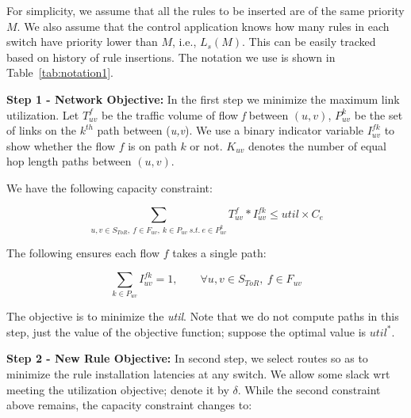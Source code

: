 For simplicity, we assume that all the rules to be inserted are of the same priority $M$.  We also assume that the control application knows how many rules in each switch have priority lower than $M$, i.e., $L_s(M)$. This can be easily tracked based on history of rule insertions. The notation we use is shown in Table~\ref{tab:notation1}.


{\bf Step 1 - Network Objective:} In the first step we minimize the
maximum link utilization. Let $T ^f _{uv}$ be the traffic volume
 of flow \textit{f} between $(u,v)$, $P^k _{uv}$ be the set of links on
the $k^{th}$ path between (\textit{u,v}). We use a
binary indicator variable $I ^{fk} _{uv}$ to show whether the flow $f$
is on path $k$ or not.  $K _{uv}$ denotes the number of equal hop
length paths between $(u,v)$. 

We have the following capacity constraint: 


\begin{scriptsize}	
\begin{equation*}
    \sum _{u,v \in S_{ToR},~f \in F_{uv},~k  \in P_{uv}~s.t.~e \in P^k _{uv}} T ^f _{uv} *  I^{fk}_{uv} \leq util \times C_e 
\end{equation*}
\end{scriptsize}	
	
The following ensures each flow $f$ takes a single path:	

\begin{equation*}
    \sum _{k  \in P_{uv}} I^{fk}_{uv} = 1 ,\quad \quad \forall u,v \in S_{ToR},~ f \in F_{uv}
\end{equation*}
 
The objective is to minimize the \textit{util}. Note that we do not
compute paths in this step, just the value of the objective function;
suppose the optimal value is $util^*$.

{\bf Step 2 - New Rule Objective:} In second step, we select routes
so as to minimize the rule installation latencies at any
switch. We allow some slack wrt meeting the utilization objective; denote it by
$\delta$. While the second constraint above remains, the capacity
constraint changes to:
 


